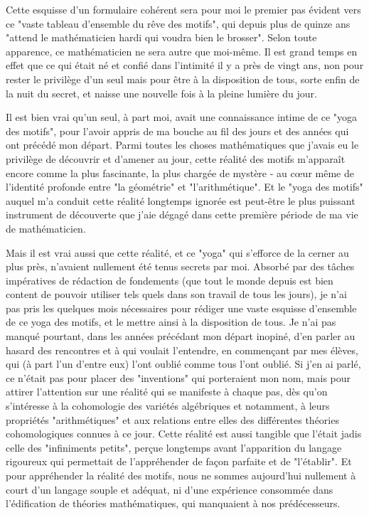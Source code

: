 Cette esquisse d'un formulaire cohérent sera pour moi le premier pas évident vers ce "vaste tableau d'ensemble du rêve des motifs", qui depuis plus de quinze ans "attend le mathématicien hardi qui voudra bien le brosser". Selon toute apparence, ce mathématicien ne sera autre que moi-même. Il est grand temps en effet que ce qui était né et confié dans l'intimité il y a près de vingt ans, non pour rester le privilège d'un seul mais pour être à la disposition de tous, sorte enfin de la nuit du secret, et naisse une nouvelle fois à la pleine lumière du jour.

Il est bien vrai qu'un seul, à part moi, avait une connaissance intime de ce "yoga des motifs", pour l'avoir appris de ma bouche au fil des jours et des années qui ont précédé mon départ. Parmi toutes les choses mathématiques que j'avais eu le privilège de découvrir et d'amener au jour, cette réalité des motifs m'apparaît encore comme la plus fascinante, la plus chargée de mystère - au cœur même de l'identité profonde entre "la géométrie" et "l'arithmétique". Et le "yoga des motifs" auquel m'a conduit cette réalité longtemps ignorée est peut-être le plus puissant instrument de découverte que j'aie dégagé dans cette première période de ma vie de mathématicien.

Mais il est vrai aussi que cette réalité, et ce "yoga" qui s'efforce de la cerner au plus près, n'avaient nullement été tenus secrets par moi. Absorbé par des tâches impératives de rédaction de fondements (que tout le monde depuis est bien content de pouvoir utiliser tels quels dans son travail de tous les jours), je n'ai pas pris les quelques mois nécessaires pour rédiger une vaste esquisse d'ensemble de ce yoga des motifs, et le mettre ainsi à la disposition de tous. Je n'ai pas manqué pourtant, dans les années précédant mon départ inopiné, d'en parler au hasard des rencontres et à qui voulait l'entendre, en commençant par mes élèves, qui (à part l'un d'entre eux) l'ont oublié comme tous l'ont oublié. Si j'en ai parlé, ce n'était pas pour placer des "inventions" qui porteraient mon nom, mais pour attirer l'attention sur une réalité qui se manifeste à chaque pas, dès qu'on s'intéresse à la cohomologie des variétés algébriques et notamment, à leurs propriétés "arithmétiques" et aux relations entre elles des différentes théories cohomologiques connues à ce jour. Cette réalité est aussi tangible que l'était jadis celle des "infiniments petits", perçue longtemps avant l'apparition du langage rigoureux qui permettait de l'appréhender de façon parfaite et de "l'établir". Et pour appréhender la réalité des motifs, nous ne sommes aujourd'hui nullement à court d'un langage souple et adéquat, ni d'une expérience consommée dans l'édification de théories mathématiques, qui manquaient à nos prédécesseurs.

